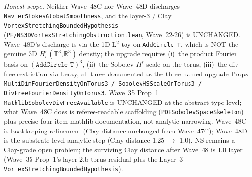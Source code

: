 \begin{remark}
\emph{Honest scope.} Neither Wave~48C nor Wave~48D discharges \texttt{NavierStokesGlobalSmoothness}, and the layer-3 / Clay \texttt{VortexStretchingBoundedHypothesis} (\texttt{PF/NS3DVortexStretchingObstruction.lean}, Wave~22-26) is UNCHANGED. Wave~48D's discharge is via the 1D L$^2$ toy on \texttt{AddCircle T}, which is NOT the genuine 3D $H^s_\sigma(\mathbb{T}^3, \mathbb{R}^3)$ density; the upgrade requires (i)~the product Fourier basis on $(\texttt{AddCircle T})^3$, (ii)~the Sobolev $H^s$ scale on the torus, (iii)~the div-free restriction via Leray, all three documented as the three named upgrade Props \texttt{MultiDimFourierDensityOnTorus3 / SobolevHSScaleOnTorus3 / DivFreeFourierDensityOnTorus3}. Wave~35 Prop~1 \texttt{MathlibSobolevDivFreeAvailable} is UNCHANGED at the abstract type level; what Wave~48C does is referee-readable scaffolding (\texttt{PDESobolevSpaceSkeleton}) plus precise four-item mathlib documentation, not analytic narrowing. Wave~48C is bookkeeping refinement (Clay distance unchanged from Wave~47C); Wave~48D is the substrate-level analytic step (Clay distance 1.25 $\to$ 1.0). NS remains a Clay-grade open problem; the surviving Clay distance after Wave~48 is 1.0 layer (Wave~35 Prop~1's layer-2.b torus residual plus the Layer~3 \texttt{VortexStretchingBoundedHypothesis}).
\end{remark}

